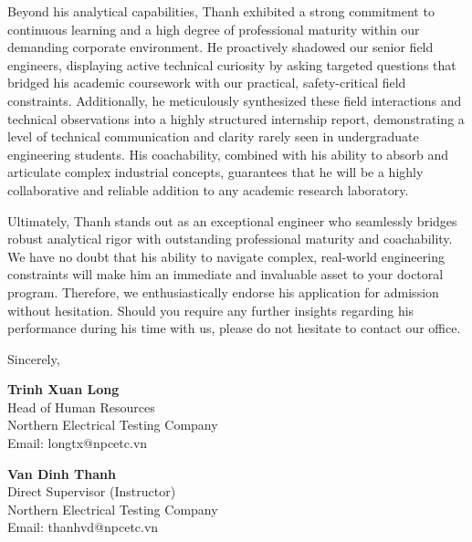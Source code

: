 \documentclass[11pt,letterpaper]{article}
\begin{document}
Beyond his analytical capabilities, Thanh exhibited a strong commitment to continuous learning and a high degree of professional maturity within our demanding corporate environment. He proactively shadowed our senior field engineers, displaying active technical curiosity by asking targeted questions that bridged his academic coursework with our practical, safety-critical field constraints. Additionally, he meticulously synthesized these field interactions and technical observations into a highly structured internship report, demonstrating a level of technical communication and clarity rarely seen in undergraduate engineering students. His coachability, combined with his ability to absorb and articulate complex industrial concepts, guarantees that he will be a highly collaborative and reliable addition to any academic research laboratory.

Ultimately, Thanh stands out as an exceptional engineer who seamlessly bridges robust analytical rigor with outstanding professional maturity and coachability. We have no doubt that his ability to navigate complex, real-world engineering constraints will make him an immediate and invaluable asset to your doctoral program. Therefore, we enthusiastically endorse his application for admission without hesitation. Should you require any further insights regarding his performance during his time with us, please do not hesitate to contact our office.

\vspace{1ex}

\noindent Sincerely,

\vspace{1.5cm}

\begin{minipage}[t]{0.45\textwidth}
\noindent \textbf{Trinh Xuan Long}\\
\noindent Head of Human Resources\\
\noindent Northern Electrical Testing Company\\
\noindent Email: longtx@npcetc.vn
\end{minipage}
\hfill
\begin{minipage}[t]{0.45\textwidth}
\noindent \textbf{Van Dinh Thanh}\\
\noindent Direct Supervisor (Instructor)\\
\noindent Northern Electrical Testing Company\\
\noindent Email: thanhvd@npcetc.vn
\end{minipage}
\end{document}

